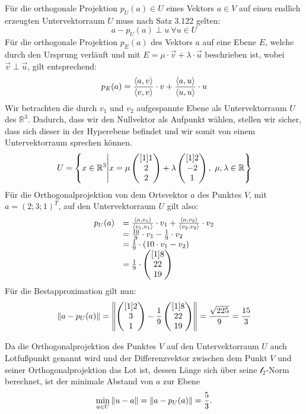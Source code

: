 \documentclass[main.tex]{subfiles}
\begin{document}
Für die orthogonale Projektion $p_{U}(a) \in U$ eines Vektors $a \in V$ auf einen endlich erzeugten Untervektorraum $U$ muss nach Satz 3.122 gelten:
\begin{equation*}
	a-p_{U}(a) \perp u \ \forall u\in U
\end{equation*}
Für die orthogonale Projektion $p_{E}( a)$ des Vektors $a$ auf eine Ebene $E$, welche durch den Ursprung verläuft und mit $E=\mu \cdot \vec{v} +\lambda \cdot \vec{u}$ beschrieben ist, wobei $\vec{v} \perp \vec{u}$, gilt entsprechend:
\begin{equation*}
	p_{E}( a) =\frac{\left\langle a,v \right\rangle}{\left\langle v,v \right\rangle} \cdot v+\frac{\left\langle a,u \right\rangle}{\left\langle u,u \right\rangle} \cdot u
\end{equation*}
Wir betrachten die durch $v_{1}$ und $v_{2}$ aufgespannte Ebene als Untervektorraum $U$ des $\mathbb{R}^{3}$. Dadurch, dass wir den Nullvektor als Aufpunkt wählen, stellen wir sicher, dass sich dieser in der Hyperebene befindet und wir somit von einem Untervektorraum sprechen können.
\begin{equation*}
	U = \left\{x\in \mathbb{R}^{3}\middle| x=\mu \begin{pmatrix}[1] 1 \\ 2 \\ 2 \end{pmatrix} + \lambda \begin{pmatrix}[1] 2 \\ -2\\ 1 \end{pmatrix},\ \mu ,\lambda \in \mathbb{R}\right\}
\end{equation*}
Für die Orthogonalprojektion von dem Ortsvektor $a$ des Punktes $V$, mit \ $a=(2;3;1)^{T}$, auf den Untervektorraum $U$ gilt also:
\begin{equation*}
	\begin{array}{ c l }
		p_{U}( a) & =\frac{\left\langle  a,v_{1} \right\rangle }{\left\langle  v_{1} ,v_{1} \right\rangle } \cdot v_{1} + \frac{\left\langle  a,v_{2} \right\rangle }{\left\langle  v_{2} ,v_{2} \right\rangle } \cdot v_{2}\\
		 & =\frac{10}{9} \cdot v_{1} -\frac{1}{9} \cdot v_{2}\\
		 & =\frac{1}{9} \cdot ( 10\cdot v_{1} -v_{2})\\
		 & =\frac{1}{9} \cdot \begin{pmatrix}[1] 8 \\ 22 \\ 19 \end{pmatrix}
	\end{array}
\end{equation*}
Für die Bestapproximation gilt nun:
\begin{equation*}
	\left\|  a-p_{U}( a)  \right\| = \left\| 
		\begin{pmatrix}[1] 2 \\ 3 \\ 1 \end{pmatrix} - \frac{1}{9}
		\begin{pmatrix}[1] 8 \\ 22 \\ 19 \end{pmatrix}
	 \right\| = \frac{\sqrt{225}}{9} = \frac{15}{3}
\end{equation*}

Da die Orthogonalprojektion des Punktes $V$ auf den Untervektorraum $U$ auch Lotfußpunkt genannt wird und der Differenzvektor zwischen dem Punkt $V$ und seiner Orthogonalprojektion das Lot ist, dessen Länge sich über seine $\mathcal{l}_{2}$-Norm berechnet, ist der minimale Abstand von $a$ zur Ebene
\begin{equation*}
	\underset{u\in U}{\min} \left\| u-a \right\| = \left\| a-p_{U}(a) \right\| = \frac{5}{3}\text{.}
\end{equation*}
\end{document}
